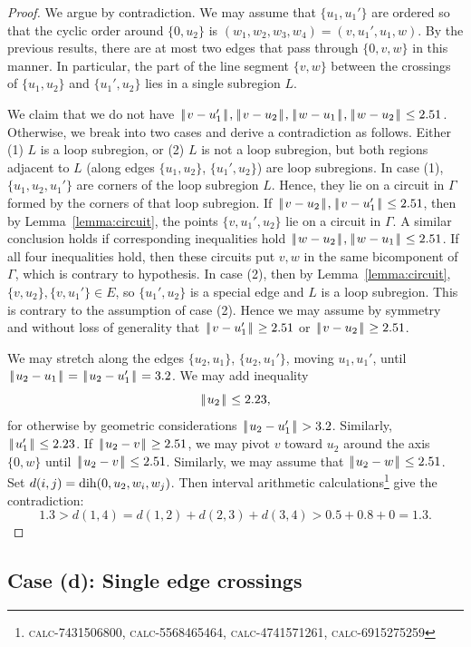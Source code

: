 \documentclass[11pt]{amsart}
\def\op#1{{\text{#1}}}
\def\text{\hbox}
\def\|{{\hskip0.1em|\hskip-0.15em|\hskip0.1em}}
\def\calc#1{{\textsc{calc-#1}}}
\begin{document}
\begin{proof}  We argue by contradiction.  We may assume that $\{u_1,u_1'\}$ are ordered so that the cyclic order around $\{0,u_2\}$ is
$(w_1,w_2,w_3,w_4)=(v,u_1',u_1,w)$. 
By the previous results, there are at most two edges that pass through $\{0,v,w\}$
in this manner.  In particular, the part of the line segment $\{v,w\}$ between the crossings
of $\{u_1,u_2\}$ and $\{u_1',u_2\}$ lies in a single subregion $L$.  

We claim that we do not have $\|v-u_1'\|,\|v-u_2\|,\|w-u_1\|,\|w-u_2\|\le 2.51$.  Otherwise, we break
into two cases and derive a contradiction as follows.  Either (1) $L$ is a loop subregion, or (2)
$L$ is not a loop subregion, but both regions adjacent to $L$ (along edges $\{u_1,u_2\}$, $\{u_1',u_2\}$)
are loop subregions.  In case (1),
$\{u_1,u_2,u_1'\}$ are corners of the loop subregion $L$.  Hence, they lie on a circuit in $\Gamma$
formed by the corners of that loop subregion.  
If $\|v-u_2\|,\|v-u_1'\|\le 2.51$, then by Lemma~\ref{lemma:circuit}, the points
$\{v,u_1',u_2\}$ lie on a circuit in $\Gamma$.  A similar conclusion holds if corresponding inequalities
hold $\|w-u_2\|,\|w-u_1\|\le 2.51$.  If all four inequalities hold, then these circuits put $v,w$ in the
same bicomponent of $\Gamma$, which is contrary to hypothesis.  
In case (2), then by Lemma~\ref{lemma:circuit}, $\{v,u_2\},\{v,u_1'\}\in E$, so $\{u_1',u_2\}$ is a special
edge and $L$ is a loop subregion.  This is contrary to the assumption of case (2).
Hence we may assume by symmetry and without
loss of generality that $\|v-u_1'\|\ge 2.51$ or $\|v-u_2\|\ge 2.51$.

We may stretch along the edges $\{u_2,u_1\}$, $\{u_2,u_1'\}$, moving $u_1,u_1'$, 
until $\|u_2-u_1\|=\|u_2-u_1'\|=3.2$.   We may add inequality
$$
\|u_2\|\le 2.23,
$$
for otherwise by geometric considerations $\|u_2-u_1'\|> 3.2$.  Similarly, $\|u_1'\|\le 2.23$.
If $\|u_2-v\|\ge 2.51$, we may pivot $v$ toward $u_2$ around the axis $\{0,w\}$ until $\|u_2-v\|\le 2.51$.
Similarly, we may assume that $\|u_2-w\|\le 2.51$.
%
Set $d(i,j) = \op{dih}(0,u_2,w_i,w_j)$.
Then interval arithmetic calculations\footnote{\calc{7431506800}, \calc{5568465464}, \calc{4741571261}, \calc{6915275259} } give the contradiction:
$$
1.3 > d(1,4) = d(1,2) +d(2,3)+d (3,4) > 0.5 + 0.8 + 0 = 1.3.
$$
\end{proof}

\subsection{Case (d): Single edge crossings}\label{sec:11}
\end{document}
